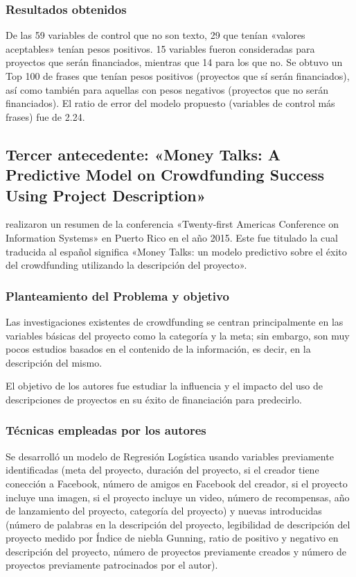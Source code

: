 \subsubsection{Resultados obtenidos}
De las 59 variables de control que no son texto, 29 que tenían «valores aceptables» tenían pesos positivos. 15 variables fueron consideradas para proyectos que serán financiados, mientras que 14 para los que no. Se obtuvo un Top 100 de frases que tenían pesos positivos (proyectos que sí serán financiados), así como también para aquellas con pesos negativos (proyectos que no serán financiados).
El ratio de error del modelo propuesto (variables de control más frases) fue de 2.24.

\subsection{Tercer antecedente: «Money Talks: A Predictive Model on Crowdfunding Success Using Project Description» \citep*{pr_zhou2015projectdesc}}
\citeauthor{pr_zhou2015projectdesc} realizaron un resumen de la conferencia «Twenty-first Americas Conference on Information Systems» en Puerto Rico en el año 2015. Este fue titulado  la cual traducida al español significa «Money Talks: un modelo predictivo sobre el éxito del crowdfunding utilizando la descripción del proyecto».

\subsubsection{Planteamiento del Problema y objetivo}
Las investigaciones existentes de crowdfunding se centran principalmente en las variables básicas del proyecto como la categoría y la meta; sin embargo, son muy pocos estudios basados en el contenido de la información, es decir, en la descripción del mismo.

El objetivo de los autores fue estudiar la influencia y el impacto del uso de descripciones de proyectos en su éxito de financiación para predecirlo.

\subsubsection{Técnicas empleadas por los autores}
Se desarrolló un modelo de Regresión Logística usando variables previamente identificadas (meta del proyecto, duración del proyecto, si el creador tiene conección a Facebook, número de amigos en Facebook del creador, si el proyecto incluye una imagen, si el proyecto incluye un video, número de recompensas, año de lanzamiento del proyecto, categoría del proyecto) y nuevas introducidas (número de palabras en la descripción del proyecto, legibilidad de descripción del proyecto medido por Índice de niebla Gunning, ratio de positivo y negativo en descripción del proyecto, número de proyectos previamente creados y número de proyectos previamente patrocinados por el autor).

